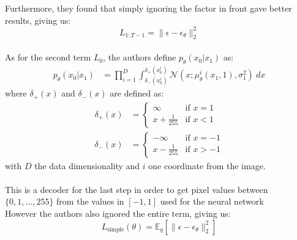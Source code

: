 \documentclass[twoside]{article}
\numberwithin{equation}{section}
\numberwithin{figure}{section}
\begin{document}
Furthermore, they found that simply ignoring the factor in front gave better results, giving us:
\begin{equation}
  L_{1:T-1} = \| \epsilon - \epsilon_\theta \|_2^2
\end{equation}
\\
As for the second term $L_0$, the authors define $p_\theta(x_0 | x_1)$ as:
\begin{align}
  p_\theta(x_0 | x_1) &= \prod_{i=1}^{D} \int_{\delta_{-} (x_0^i)}^{\delta_{+} (x_0^i)} \mathcal{N}(x; \mu_\theta^i (x_1, 1), \sigma^2_1) \: dx
\end{align}
\hspace{0.5cm} where $\delta_{+} (x)$ and $\delta_{-} (x)$ are defined as:
\begin{align}
  \delta_{+} (x) &= \begin{cases}
    \infty & \text{if } x = 1 \\
    x + \frac{1}{255} & \text{if } x < 1 
  \end{cases}\\
  \delta_{-} (x) &= \begin{cases}
    - \infty & \text{if } x = - 1 \\
    x - \frac{1}{255} & \text{if } x > -1 
  \end{cases}
\end{align}
\hspace{0.5cm} with $D$ the data dimensionality and $i$ one coordinate from the image.
\\\\
This is a decoder for the last step in order to get pixel values between $\{0, 1, ..., 255 \}$ from the values in $[-1, 1]$ used for the neural network \cite{ho2020denoising,nichol2021improved} \\
However the authors also ignored the entire term, giving us:
\begin{equation}
  L_{\text{simple}}(\theta) = \mathbb{E}_q \left[ \| \epsilon - \epsilon_\theta \|_2^2 \right] \label{eq:l_simple}
\end{equation}
\\\\
\end{document}

